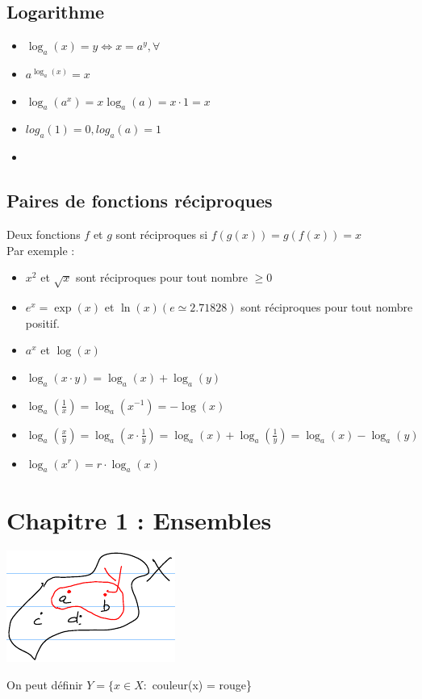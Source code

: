 \documentclass[12pt,a4paper]{article}
\begin{document}
\subsection{Logarithme}
\begin{itemize}
	\item $\log_a(x) = y \iff x =  a^y,\forall$
	\item $a^{\log_a(x)} = x$
	\item $\log_a(a^x) = x\log_a(a) = x \cdot 1 = x$
	\item $log_a(1) = 0, log_a(a) = 1$
	\item
\end{itemize}

\subsection{Paires de fonctions réciproques}
Deux fonctions $f$ et $g$ sont réciproques si $f(g(x)) = g(f(x)) = x$\\
Par exemple :
\begin{itemize}
\item $x^2$ et $\sqrt{x}$ sont réciproques pour tout nombre $\geq 0$
\item $e^x = \exp(x)$ et $\ln(x) (e \simeq 2.71828)$ sont réciproques pour tout nombre positif.
\item $a^x$ et $\log(x)$
\item $\log_a(x\cdot y) = \log_a(x) + \log_a(y)$
\item $\log_a(\frac{1}{x}) = \log_a(x^{-1}) = -\log(x)$
\item $\log_a(\frac{x}{y}) = \log_a(x \cdot \frac{1}{y}) =\log_a(x) + \log_a(\frac{1}{y}) = \log_a(x) - \log_a(y)$
\item $\log_a(x^r) = r\cdot \log_a(x)$
\end{itemize}

\section{Chapitre 1 : Ensembles}
\setcounter{equation}{0}
\begin{center}
\includegraphics[scale=1]{illustrations_Analyse/ensemble}\\	
\end{center}
On peut définir $Y =\{x \in X :$ couleur(x) = rouge\}
\end{document}

